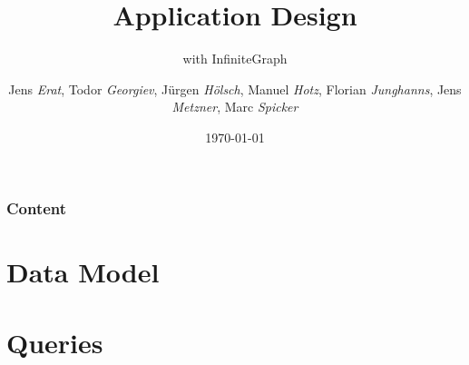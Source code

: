 \documentclass{beamer}
\title[Application Design]{\textsf{Application Design}}
\subtitle{with InfiniteGraph}
\author[JE,TG,JH,MH,FJ,JM,MS]{Jens \textit{Erat},
Todor \textit{Georgiev},
J\"{u}rgen \textit{H\"{o}lsch},
Manuel \textit{Hotz},
Florian \textit{Junghanns},
Jens \textit{Metzner},
Marc \textit{Spicker}}
\institute[]{Universität Konstanz}
\date{\today}
\begin{document}

\begin{frame}
\titlepage
\end{frame}


\begin{frame}
\frametitle{Content}
\tableofcontents
\end{frame}


\section{Data Model}



\section{Queries}

\end{document}

